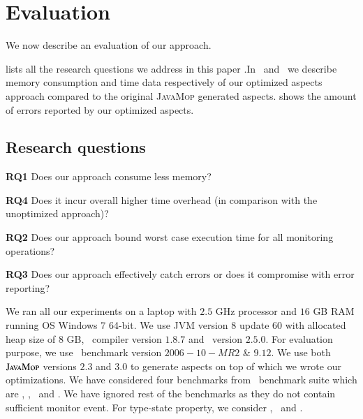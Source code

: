 \section{Evaluation}
\label{sec:evaluation}

We now describe an evaluation of our approach.

 lists all the research questions we address in this
paper .In~ and~ we
describe memory consumption and time data respectively of our optimized aspects approach compared to the original \textsc{JavaMop} generated aspects. 
 shows the amount of errors reported by our
optimized aspects.

\subsection{Research questions} 
\label{sec:evaluation:rq}

\begin{mybullet}
 \item[\textbf{RQ1}] Does our approach consume less memory?
\item[\textbf{RQ4}] Does it incur overall higher time overhead (in comparison
with the unoptimized approach)?
\item[\textbf{RQ2}] Does our approach bound worst case execution time for all
monitoring operations?
\item[\textbf{RQ3}] Does our approach effectively catch errors or
does it compromise with error reporting?
\end{mybullet}




We ran all our experiments on a laptop with $2.5$ GHz processor and $16$ GB RAM
running OS Windows 7 64-bit. We use JVM version $8$ update $60$ with allocated heap size of $8$ GB, \aspectj\ compiler version $1.8.7$ and
\soot\ version $2.5.0$. For evaluation purpose, we use \dacapo\
benchmark version $2006-10-MR2$ \& $9.12$. We use both $\textsc{JavaMop}$ versions
$2.3$ and $3.0$ to generate aspects on top of which we wrote our optimizations.
We have considered four benchmarks from \dacapo\ benchmark suite which
are \bloat, \pmd, \chart\ and \avrora. We have ignored rest of the benchmarks as
they do not contain sufficient monitor event. For type-state property, we
consider \hasnext, \unsafeiter\ and \hashset. 



